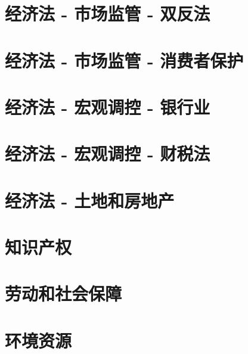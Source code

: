 \chapter{经济法 - 市场监管 - 双反法}



\chapter{经济法 - 市场监管 - 消费者保护}




\chapter{经济法 - 宏观调控 - 银行业}



\chapter{经济法 - 宏观调控 - 财税法}






\chapter{经济法 - 土地和房地产}





\chapter{知识产权}




\chapter{劳动和社会保障}






\chapter{环境资源}






